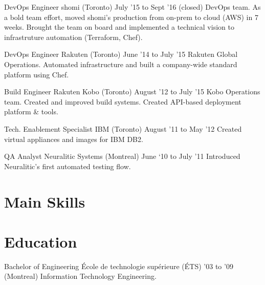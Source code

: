 \documentclass[]{cvpn}
\begin{document}
\begin{multicols}{2}
\begin{eventlist}
\item{DevOps Engineer}
     {shomi (Toronto)}
     {July '15 to Sept '16 (closed)}
{
DevOps team. As a bold team effort, moved shomi's
production from on-prem to cloud (AWS) in 7 weeks.
Brought the team on board and implemented a technical
vision to infrastruture automation (Terraform, Chef).
}

\item{DevOps Engineer}
     {Rakuten (Toronto)}
     {June '14 to July '15}
{
Rakuten Global Operations.
Automated infrastructure and built a company-wide
standard platform using Chef.
}

\eventlink{}

\item{Build Engineer}
     {Rakuten Kobo (Toronto)}
     {August '12 to July '15}
{
Kobo Operations team.
Created and improved build systems.
Created API-based deployment platform \& tools.
}

\item{Tech. Enablement Specialist}
     {IBM (Toronto)}
     {August '11 to May '12}
{
Created virtual appliances and images for IBM DB2.
}

\item{QA Analyst}
     {Neuralitic Systems (Montreal)}
     {June ‘10 to July ’11}
{
Introduced Neuralitic's first automated testing flow.
}

\end{eventlist}

\section{Main Skills}

\begin{skillslist}


\end{skillslist}

\section{Education}
\begin{eventlist}

\item{Bachelor of Engineering}
     {École de technologie supérieure (ÉTS)}
     {'03 to '09}
{
(Montreal) Information Technology Engineering.
}


\end{eventlist}
\end{multicols}
\end{document}
